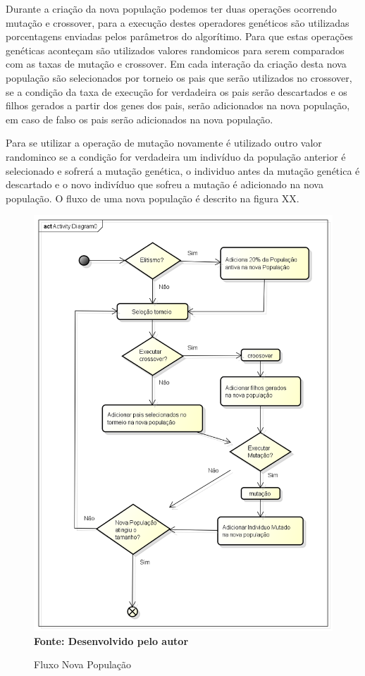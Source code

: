 Durante a criação da nova população podemos ter duas operações ocorrendo mutação e crossover, para a execução destes operadores genéticos são utilizadas porcentagens enviadas pelos parâmetros do algorítimo. Para que estas operações genéticas aconteçam são utilizados valores randomicos para serem comparados com as taxas de mutação e crossover. Em cada interação da criação desta nova população são selecionados por torneio os pais que serão utilizados no crossover, se a condição da taxa de execução for verdadeira os pais serão descartados e os filhos gerados a partir dos genes dos pais, serão adicionados na nova população, em caso de falso os pais serão adicionados na nova população.\par
Para se utilizar a operação de mutação novamente é utilizado outro valor randominco se a condição for verdadeira um indivíduo da população anterior é selecionado e sofrerá a mutação genética, o individuo antes da mutação genética é descartado e o novo indivíduo que sofreu a mutação é adicionado na nova população. O fluxo de uma nova população é descrito na figura XX.\par

\begin{figure}[!htb]
\caption[Fluxo Nova População]{Fluxo Nova População}
\label{fig:figura8}
\centering
\includegraphics[scale=0.7]{imagens/fluxoNovaPopulacao.png}
\\ \textbf{\footnotesize Fonte: Desenvolvido pelo autor}
\end{figure}

